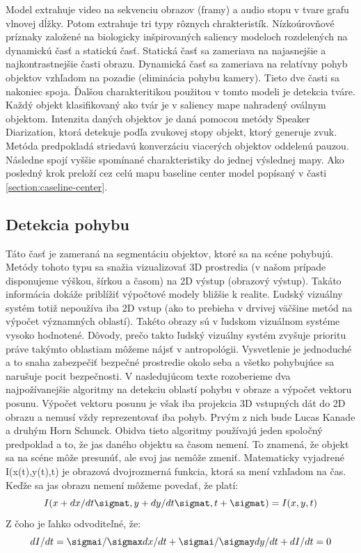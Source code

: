 Model extrahuje video na sekvenciu obrazov (framy) a audio stopu v tvare grafu vlnovej dĺžky.
Potom extrahuje tri typy rôznych chrakteristík.
Nízkoúrovňové príznaky založené na biologicky inšpirovaných saliency modeloch rozdelených na dynamickú časť a statickú časť.
Statická časť sa zameriava na najasnejšie a najkontrastnejšie časti obrazu.
Dynamická časť sa zameriava na relatívny pohyb objektov vzhľadom na pozadie (eliminácia pohybu kamery).
Tieto dve časti sa nakoniec spoja.
Ďalšou charakteritikou použitou v tomto modeli je detekcia tváre.
Každý objekt klasifikovaný ako tvár je v saliency mape nahradený oválnym objektom.
Intenzita daných objektov je daná pomocou metódy Speaker Diarization\cite{sound-courot-2}, ktorá detekuje podľa zvukovej stopy objekt, ktorý generuje zvuk.
Metóda predpokladá striedavú konverzáciu viacerých objektov oddelenú pauzou.
Následne spojí vyššie spomínané charakteristiky do jednej výslednej mapy.
Ako posledný krok preloží cez celú mapu baseline center model popísaný v časti \ref{section:caseline-center}.

\subsection{Detekcia pohybu}
Táto časť je zameraná na segmentáciu objektov, ktoré sa na scéne pohybujú.
Metódy tohoto typu sa snažia vizualizovať 3D prostredia (v našom prípade disponujeme výškou, šírkou a časom) na 2D výstup (obrazový výstup).
Takáto informácia dokáže priblížiť výpočtové modely bližšie k realite.
Ľudský vizuálny systém totiž nepoužíva iba 2D vstup (ako to prebieha v drvivej väčšine metód na výpočet významných oblastí).
Takéto obrazy sú v ľudskom vizuálnom systéme vysoko hodnotené.
Dôvody, prečo takto ľudský vizuálny systém zvyšuje prioritu práve takýmto oblastiam môžeme nájsť v antropológii.
Vysvetlenie je jednoduché a to snaha zabezpečiť bezpečné prostredie okolo seba a všetko pohybujúce sa narušuje pocit bezpečnosti.
V nasledujúcom texte rozoberieme dva najpožívanejšie algoritmy na detekciu oblastí pohybu v obraze a výpočet vektoru posunu.
Výpočet vektoru posunu je však iba projekcia 3D vstupných dát do 2D obrazu a nemusí vždy reprezentovať iba pohyb.
Prvým z nich bude Lucas Kanade\cite{lucas-kanade} a druhým Horn Schunck\cite{hs-original}.
Obidva tieto algoritmy používajú jeden spoločný predpoklad a to, že jas daného objektu sa časom nemení.
To znamená, že objekt sa na scéne môže presunúť, ale svoj jas nemôže zmeniť.
Matematicky vyjadrené I(x(t),y(t),t) je obrazová dvojrozmerná funkcia, ktorá sa mení vzhľadom na čas.
Keďže sa jas obrazu nemení môžeme povedať, že platí:
\begin{equation}
  I(x + dx/dt \sigmat ,y + dy/dt \sigmat, t + \sigmat) = I(x,y,t)
\end{equation}
Z čoho je ľahko odvoditeľné, že:
\begin{equation}
  dI/dt = \sigmai/\sigmax dx/dt + \sigmai/\sigmay dy/dt + dI/dt  =  0
\end{equation}

